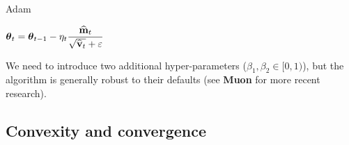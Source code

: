 \documentclass[12pt,aspectratio=169]{beamer}
\begin{document}
\begin{frame}{Adam}
	\vspace{-0.15cm}

	\begin{center}
	\begin{tcolorbox}[
		width=0.62\textwidth,
		colback=darkred!3,
		colframe=darkred,
		boxrule=0.75pt,
		arc=1.5pt,
		left=4pt,
		right=4pt,
		top=4pt,
		bottom=4pt
	]
		\centering
		$\displaystyle
		\boldsymbol{\mathbf{\theta}}_t=
		\boldsymbol{\mathbf{\theta}}_{t-1}
		-\eta_t
		\frac{\widehat{\boldsymbol{\mathbf{m}}}_t}
		{\sqrt{\widehat{\boldsymbol{\mathbf{v}}}_t}+\varepsilon}$
	\end{tcolorbox}
	\end{center}

	\vspace{-0.35cm}

	\footnotesize
	We need to introduce two additional hyper-parameters ($\beta_1,\beta_2\in[0,1)$), but the algorithm is generally robust to their defaults (see \textbf{Muon} for more recent research).
\end{frame}

\subsection{Convexity and convergence}
\end{document}
